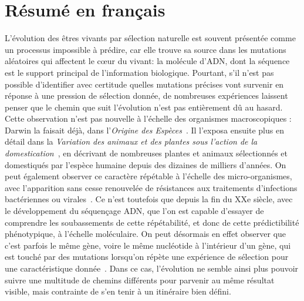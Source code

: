 
\chapter{Résumé en français}

L'évolution des êtres vivants par sélection naturelle est souvent présentée comme un processus impossible à prédire, car elle trouve sa source dans les mutations aléatoires qui affectent le cœur du vivant: la molécule d'ADN, dont la séquence est le support principal de l'information biologique.
Pourtant, s'il n'est pas possible d'identifier avec certitude quelles mutations précises vont survenir en réponse à une pression de sélection donnée, de nombreuses expériences laissent penser que le chemin que suit l'évolution n'est pas entièrement dû au hasard.
Cette observation n'est pas nouvelle à l'échelle des organismes macroscopiques : Darwin la faisait déjà, dans l'\emph{Origine des Espèces}~\citep{darwin1859}.
Il l'exposa ensuite plus en détail dans la \emph{Variation des animaux et des plantes sous l'action de la domestication}~\citep{darwin1868}, en décrivant de nombreuses plantes et animaux sélectionnés et domestiqués par l'espèce humaine depuis des dizaines de milliers d'années.
On peut également observer ce caractère répétable à l'échelle des micro-organismes, avec l'apparition sans cesse renouvelée de résistances aux traitements d'infections bactériennes ou virales~\citep{levy2004}.
Ce n'est toutefois que depuis la fin du XXe siècle, avec le développement du séquençage ADN, que l'on est capable d'essayer de comprendre les soubassements de cette répétabilité, et donc de cette prédictibilité phénotypique, à l'échelle moléculaire.
On peut désormais en effet observer que c'est parfois le même gène, voire le même nucléotide à l'intérieur d'un gène, qui est touché par des mutations lorsqu'on répète une expérience de sélection pour une caractéristique donnée~\citep{wortel2021}.
Dans ce cas, l'évolution ne semble ainsi plus pouvoir suivre une multitude de chemins différents pour parvenir au même résultat visible, mais contrainte de s'en tenir à un itinéraire bien défini.

